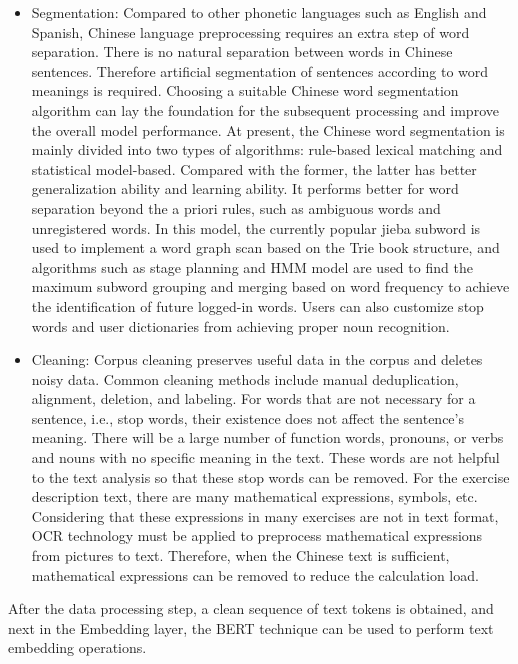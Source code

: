 \begin{itemize}
	\item Segmentation: Compared to other phonetic languages such as English and Spanish, Chinese language preprocessing requires an extra step of word separation.  There is no natural separation between words in Chinese sentences. Therefore artificial segmentation of sentences according to word meanings is required. Choosing a suitable Chinese word segmentation algorithm can lay the foundation for the subsequent processing and improve the overall model performance. At present, the Chinese word segmentation is mainly divided into two types of algorithms: rule-based lexical matching and statistical model-based. Compared with the former, the latter has better generalization ability and learning ability. It performs better for word separation beyond the a priori rules, such as ambiguous words and unregistered words. In this model, the currently popular jieba subword is used to implement a word graph scan based on the Trie book structure, and algorithms such as stage planning and HMM model are used to find the maximum subword grouping and merging based on word frequency to achieve the identification of future logged-in words. Users can also customize stop words and user dictionaries from achieving proper noun recognition.
	\item Cleaning: Corpus cleaning preserves useful data in the corpus and deletes noisy data. Common cleaning methods include manual deduplication, alignment, deletion, and labeling. For words that are not necessary for a sentence, i.e., stop words, their existence does not affect the sentence's meaning. There will be a large number of function words, pronouns, or verbs and nouns with no specific meaning in the text. These words are not helpful to the text analysis so that these stop words can be removed. For the exercise description text, there are many mathematical expressions, symbols, etc. Considering that these expressions in many exercises are not in text format, OCR technology must be applied to preprocess mathematical expressions from pictures to text. Therefore, when the Chinese text is sufficient, mathematical expressions can be removed to reduce the calculation load.
\end{itemize}

After the data processing step, a clean sequence of text tokens is obtained, and next in the Embedding layer, the BERT technique can be used to perform text embedding operations.

